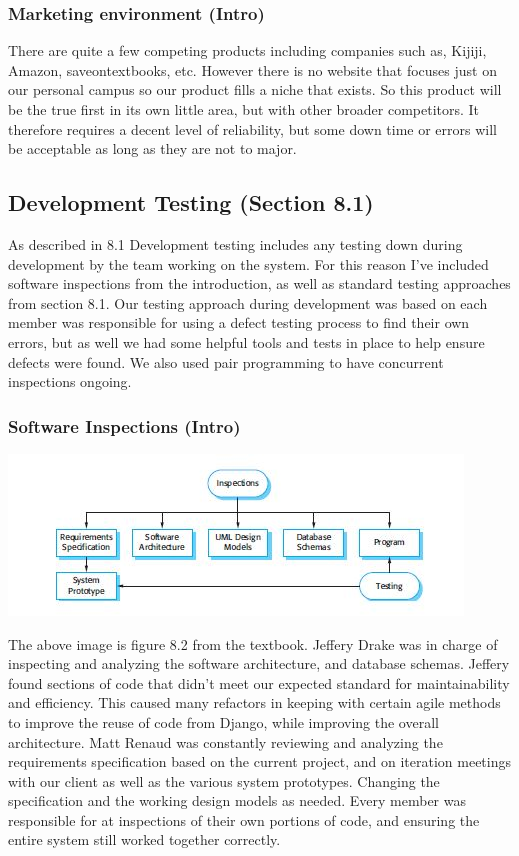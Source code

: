 \documentclass[11pt]{article}
\begin{document}
		\subsubsection{Marketing environment (Intro)}
			There are quite a few competing products including companies such as, Kijiji, Amazon, saveontextbooks, etc.
			However there is no website that focuses just on our personal campus so our product fills a niche that exists.
			So this product will be the true first in its own little area, but with other broader competitors.
			It therefore requires a decent level of reliability, but some down time or errors will be acceptable as long as they are not to major.

	\subsection{Development Testing (Section 8.1)}
		As described in 8.1 Development testing includes any testing down during development by the team working on the system. 
		For this reason I've included software inspections from the introduction, as well as standard testing approaches from section 8.1.
		Our testing approach during development was based on each member was responsible for using a defect testing process to find their own errors, but as well we had some helpful tools and tests in place to help ensure defects were found. 
		We also used pair programming to have concurrent inspections ongoing.

		\subsubsection{Software Inspections (Intro)}
			\centerline{\includegraphics[scale=0.75]{./images/inspections.JPG}} 
			The above image is figure 8.2 from the textbook. Jeffery Drake was in charge of inspecting and analyzing the software architecture, and database schemas. 
			Jeffery found sections of code that didn't meet our expected standard for maintainability and efficiency. 
			This caused many refactors in keeping with certain agile methods to improve the reuse of code from Django, while improving the overall architecture.  
			Matt Renaud was constantly reviewing and analyzing the requirements specification based on the current project, and on iteration meetings with our client as well as the various system prototypes. 
			Changing the specification and the working design models as needed. 
			Every member was responsible for at inspections of their own portions of code, and ensuring the entire system still worked together correctly.
\end{document}
